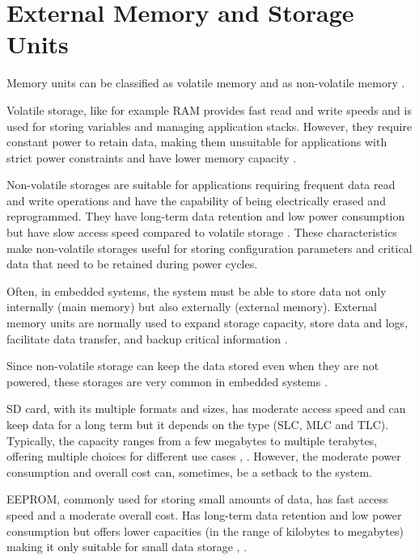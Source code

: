 \section{External Memory and Storage Units}

Memory units can be classified as volatile memory and as non-volatile memory \cite{mem3}.

Volatile storage, like for example \gls{RAM} provides fast read and write speeds and is used for storing variables and managing application stacks.
However, they require constant power to retain data, making them unsuitable for applications with strict power constraints and have lower memory capacity \cite{mem8}.

Non-volatile storages are suitable for applications requiring frequent data read and write operations and have the capability of being electrically erased and reprogrammed.
They have long-term data retention and low power consumption but have slow access speed compared to volatile storage \cite{mem8}.
These characteristics make non-volatile storages useful for storing configuration parameters and critical data that need to be retained during power cycles.

Often, in embedded systems, the system must be able to store data not only internally (main memory) but also externally (external memory).
External memory units are normally used to expand storage capacity, store data and logs, facilitate data transfer, and backup critical information \cite{mem3}.

Since non-volatile storage can keep the data stored even when they are not powered, these storages are very common in embedded systems \cite{mem1}.

\gls{SD} card, with its multiple formats and sizes, has moderate access speed and can keep data for a long term but it depends on the type (\gls{SLC}, \gls{MLC} and \gls{TLC}).
Typically, the capacity ranges from a few megabytes to multiple terabytes, offering multiple choices for different use cases \cite{mem11}, \cite{mem9}.
However, the moderate power consumption and overall cost can, sometimes, be a setback to the system.

\gls{EEPROM}, commonly used for storing small amounts of data, has fast access speed and a moderate overall cost.
Has long-term data retention and low power consumption but offers lower capacities (in the range of kilobytes to megabytes) making it only suitable for small data storage \cite{mem8}, \cite{mem11}.

